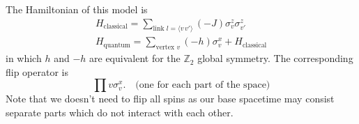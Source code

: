 The Hamiltonian of this model is
\begin{equation}
  \begin{gathered}
  H_{\text{classical}} = \sum_{\text{link $l=\langle v\,v' \rangle$}} (-J) \sigma _{v}^{z} \sigma _{v'}^{z}
  \\
  H_{\text{quantum}} = \sum_{\text{vertex $v$}} (-h) \sigma _{v}^{x}+ H_{\text{classical}}
  \end{gathered}
\end{equation}
in which $h$ and $-h$ are equivalent for the $\mathbb{Z}_2$ global symmetry. The corresponding flip operator is
\begin{equation}
  \prod{v} \sigma _{v}^{x}. \quad \text{(one for each part of the space)}
\end{equation}
Note that we doesn't need to flip all spins as our base spacetime may consist separate parts which do not interact with each other.







